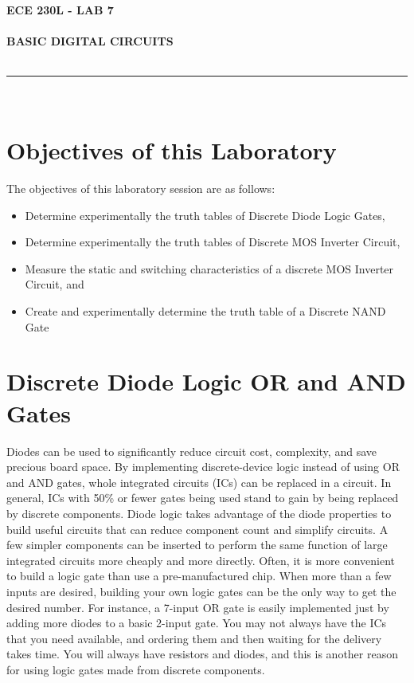 \documentclass[12pt]{../manual}
\begin{document}
\begin{center}
\textbf{\huge ECE 230L - LAB 7}\\~\\
\textbf{\large BASIC DIGITAL CIRCUITS}\\~\\
\rule{6.5in}{0.5mm}\\
\end{center}

\tableofcontents

\listoffigures

\newpage
%
\section{Objectives of this Laboratory}
The objectives of this laboratory session are as follows:
\begin{itemize}
\item Determine experimentally the truth tables of Discrete Diode Logic Gates,
\item Determine experimentally the truth tables of Discrete MOS Inverter Circuit,
\item Measure the static and switching characteristics of a discrete MOS Inverter Circuit, and
\item Create and experimentally determine the truth table of a Discrete NAND Gate
\end{itemize}

\section{Discrete Diode Logic OR and AND Gates}
Diodes can be used to significantly reduce circuit cost, complexity, and save precious board space. By implementing discrete-device logic instead of using OR and AND gates, whole integrated circuits (ICs) can be replaced in a circuit. In general, ICs with 50\% or fewer gates being used stand to gain by being replaced by discrete components. Diode logic takes advantage of the diode properties to build useful circuits that can reduce component count and simplify circuits. A few simpler components can be inserted to perform the same function of large integrated circuits more cheaply and more directly. Often, it is more convenient to build a logic gate than use a pre-manufactured chip. When more than a few inputs are desired, building your own logic gates can be the only way to get the desired number. For instance, a 7-input OR gate is easily implemented just by adding more diodes to a basic 2-input gate. You may not always have the ICs that you need available, and ordering them and then waiting for the delivery takes time. You will always have resistors and diodes, and this is another reason for using logic gates made from discrete components.
\end{document}
